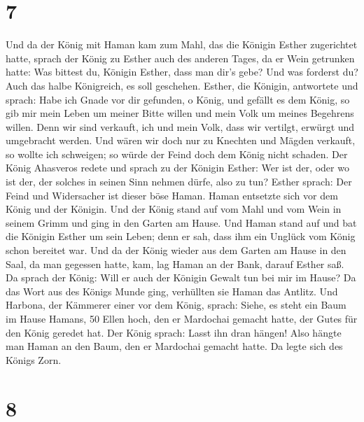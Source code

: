 \hypertarget{section-6}{%
\section{7}\label{section-6}}

 Und da der König mit Haman kam zum Mahl, das die Königin
Esther zugerichtet hatte,  sprach der König zu Esther auch
des anderen Tages, da er Wein getrunken hatte: Was bittest du, Königin
Esther, dass man dir's gebe? Und was forderst du? Auch das halbe
Königreich, es soll geschehen.  Esther, die Königin,
antwortete und sprach: Habe ich Gnade vor dir gefunden, o König, und
gefällt es dem König, so gib mir mein Leben um meiner Bitte willen und
mein Volk um meines Begehrens willen.  Denn wir sind
verkauft, ich und mein Volk, dass wir vertilgt, erwürgt und umgebracht
werden. Und wären wir doch nur zu Knechten und Mägden verkauft, so
wollte ich schweigen; so würde der Feind doch dem König nicht schaden.
 Der König Ahasveros redete und sprach zu der Königin
Esther: Wer ist der, oder wo ist der, der solches in seinen Sinn nehmen
dürfe, also zu tun?  Esther sprach: Der Feind und
Widersacher ist dieser böse Haman. Haman entsetzte sich vor dem König
und der Königin.  Und der König stand auf vom Mahl und vom
Wein in seinem Grimm und ging in den Garten am Hause. Und Haman stand
auf und bat die Königin Esther um sein Leben; denn er sah, dass ihm ein
Unglück vom König schon bereitet war.  Und da der König
wieder aus dem Garten am Hause in den Saal, da man gegessen hatte, kam,
lag Haman an der Bank, darauf Esther saß. Da sprach der König: Will er
auch der Königin Gewalt tun bei mir im Hause? Da das Wort aus des Königs
Munde ging, verhüllten sie Haman das Antlitz.  Und
Harbona, der Kämmerer einer vor dem König, sprach: Siehe, es steht ein
Baum im Hause Hamans, 50 Ellen hoch, den er Mardochai gemacht hatte, der
Gutes für den König geredet hat. Der König sprach: Lasst ihn dran
hängen!  Also hängte man Haman an den Baum, den er
Mardochai gemacht hatte. Da legte sich des Königs Zorn.

\hypertarget{section-7}{%
\section{8}\label{section-7}}

